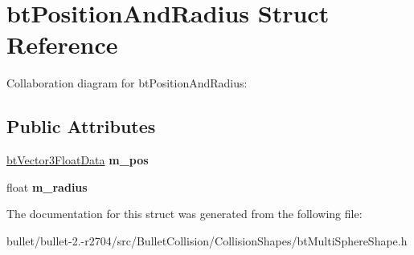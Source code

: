 \hypertarget{structbt_position_and_radius}{\section{bt\+Position\+And\+Radius Struct Reference}
\label{structbt_position_and_radius}
}


Collaboration diagram for bt\+Position\+And\+Radius\+:
\subsection*{Public Attributes}
\begin{DoxyCompactItemize}
\item 
\hypertarget{structbt_position_and_radius_ad3c3f39664da90d0d54f632f584f14dc}{\hyperlink{structbt_vector3_float_data}{bt\+Vector3\+Float\+Data} {\bfseries m\+\_\+pos}}\label{structbt_position_and_radius_ad3c3f39664da90d0d54f632f584f14dc}

\item 
\hypertarget{structbt_position_and_radius_aaf6d3dc5f4db916e0f91026dcc57be26}{float {\bfseries m\+\_\+radius}}\label{structbt_position_and_radius_aaf6d3dc5f4db916e0f91026dcc57be26}

\end{DoxyCompactItemize}


The documentation for this struct was generated from the following file\+:\begin{DoxyCompactItemize}
\item 
bullet/bullet-\/2.-\/r2704/src/\+Bullet\+Collision/\+Collision\+Shapes/bt\+Multi\+Sphere\+Shape.\+h\end{DoxyCompactItemize}

